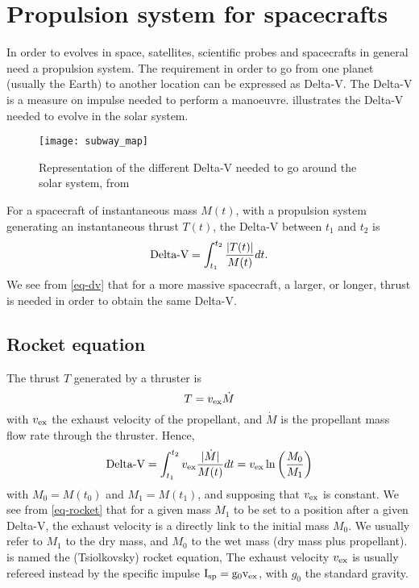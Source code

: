


\section*{Propulsion system for spacecrafts}
\label{sec-propulsion}


In order to evolves in space, satellites, scientific probes and spacecrafts in general need a propulsion system.
The requirement in order to go from one planet (usually the Earth) to another location can be expressed as Delta-V.
The Delta-V is a measure on impulse needed to perform a manoeuvre.
 illustrates the Delta-V needed to evolve in the solar system.
\begin{figure}[hbtp]
  \centering
  \texttt{[image: subway\_map]}
  \caption{Representation of the different Delta-V needed to go around the solar system, from \citet{reddit-subway}}
  \label{fig-subway_DV}
\end{figure}


For a spacecraft of instantaneous mass $M(t)$, with a propulsion system generating an instantaneous thrust $T(t)$, the Delta-V between $t_1$ and $t_2$ is
\begin{equation} \label{eq-dv}
  \text{Delta-V} = \int_{t_1}^{t_2} \frac{ \lvert T(t)\rvert}{M(t)} dt.
\end{equation}
We see from \cref{eq-dv} that for a more massive spacecraft, a larger, or longer, thrust is needed in order to obtain the same Delta-V.

\subsection*{Rocket equation}
The thrust $T$ generated by a  thruster is
\begin{equation} \label{eq-thurst}
  T = v_{\rm ex} \dot{M}
\end{equation}
with $v_{\rm ex}$ the exhaust velocity of the propellant, and $\dot{M}$ is the propellant mass flow rate through the thruster.
Hence,
\begin{equation} \label{eq-rocket}
  \text{Delta-V} = \int_{t_1}^{t_2} v_{\rm ex} \frac{ \lvert\dot{M}\rvert}{M(t)} dt = v_{\rm ex} \ln \left( \frac{M_0}{M_1} \right)
\end{equation}
with $M_0 = M(t_0)$ and $M_1=M(t_1)$, and supposing that $v_{\rm ex}$ is constant.
We see from \cref{eq-rocket} that for a given mass $M_1$ to be set to a position after a given Delta-V, the exhaust velocity is a directly link to the initial mass $M_0$.
We usually refer to $M_1$ to the dry mass, and $M_0$ to the wet mass (dry mass plus propellant).
 is named the (Tsiolkovsky) rocket equation, 
The exhaust velocity $v_{\rm ex}$ is usually refereed instead by the specific impulse $\rm I_{\rm sp} = g_0 v_{\rm ex}$, with $g_0$ the standard gravity.


